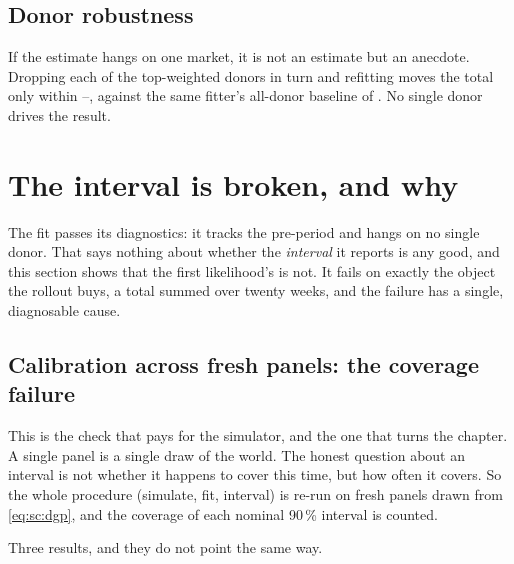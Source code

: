 

\subsection*{Donor robustness}

If the estimate hangs on one market, it is not an estimate but an anecdote. Dropping each of the
top-weighted donors in turn and refitting moves the total only within
\keur{\nbSevenLooLo}--\keur{\nbSevenLooHi}, against the same fitter's all-donor baseline of
\keur{\nbSevenClTotal}. No single donor drives the result.

\section{The interval is broken, and why}
\label{sec:sc:valid}

The fit passes its diagnostics: it tracks the pre-period and hangs on no single donor. That says
nothing about whether the \emph{interval} it reports is any good, and this section shows that the
first likelihood's is not. It fails on exactly the object the rollout buys, a total summed over
twenty weeks, and the failure has a single, diagnosable cause.

\subsection*{Calibration across fresh panels: the coverage failure}

This is the check that pays for the simulator, and the one that turns the chapter. A single panel
is a single draw of the world. The honest question about an interval is not whether it happens to
cover this time, but how often it covers. So the whole procedure (simulate, fit, interval) is
re-run on \nbSevenNPanels{} fresh panels drawn from \cref{eq:sc:dgp}, and the coverage of each
nominal 90\,\% interval is counted.

Three results, and they do not point the same way.

